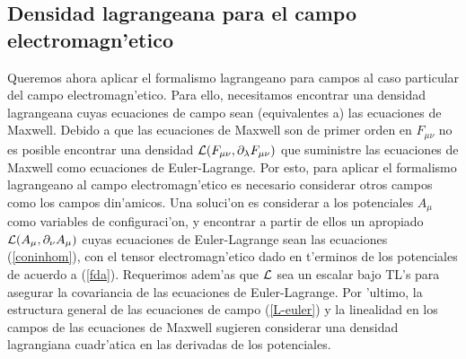 \subsection{Densidad lagrangeana para el campo electromagn'etico}
Queremos ahora aplicar el formalismo lagrangeano para campos al caso particular
del campo electromagn'etico. Para ello, necesitamos encontrar una densidad
lagrangeana cuyas ecuaciones de campo sean (equivalentes a) las ecuaciones de
Maxwell. Debido a que las ecuaciones de Maxwell son de primer orden en
$F_{\mu\nu}$ no es posible encontrar una densidad ${\cal
L}(F_{\mu\nu},\partial_\lambda F_{\mu\nu})$ que suministre las ecuaciones de
Maxwell como ecuaciones de Euler-Lagrange. Por esto, para aplicar el formalismo
lagrangeano al campo electromagn'etico es necesario considerar otros campos como
los campos din'amicos. Una soluci'on es considerar a los potenciales $A_\mu$
como variables de configuraci'on, y encontrar a partir de ellos un apropiado
${\cal L}(A_\mu,\partial_\nu A_\mu)$ cuyas ecuaciones de Euler-Lagrange sean las
ecuaciones (\ref{coninhom}), con el tensor electromagn'etico dado en
t'erminos de los potenciales de acuerdo a (\ref{fda}). Requerimos
adem'as que $\cal L$ sea un escalar bajo TL's para asegurar la
covariancia de las ecuaciones de Euler-Lagrange. Por 'ultimo, la estructura
general de las ecuaciones de campo (\ref{L-euler}) y la linealidad en los campos
de las ecuaciones de Maxwell sugieren considerar una densidad lagrangiana
cuadr'atica en las derivadas de los potenciales.

